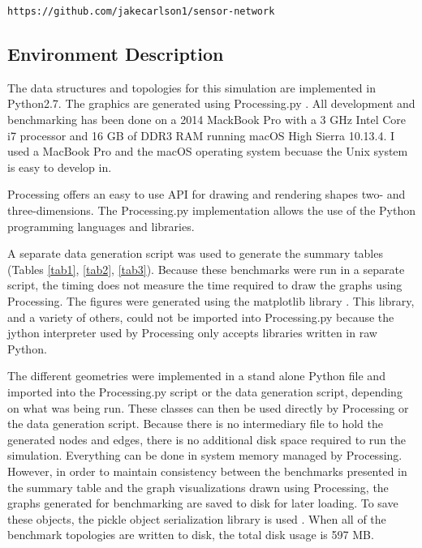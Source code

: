\documentclass{article}
\begin{document}
    \begin{center}
        \texttt{https://github.com/jakecarlson1/sensor-network}
    \end{center}

    \subsection{Environment Description}
    The data structures and topologies for this simulation are implemented in Python2.7. The graphics are generated using Processing.py \cite{processing}. All development and benchmarking has been done on a 2014 MackBook Pro with a 3 GHz Intel Core i7 processor and 16 GB of DDR3 RAM running macOS High Sierra 10.13.4. I used a MacBook Pro and the macOS operating system becuase the Unix system is easy to develop in.
    \par
    Processing offers an easy to use API for drawing and rendering shapes two- and three-dimensions. The Processing.py implementation allows the use of the Python programming languages and libraries.
    \par
    A separate data generation script was used to generate the summary tables (Tables \ref{tab1}, \ref{tab2}, \ref{tab3}). Because these benchmarks were run in a separate script, the timing does not measure the time required to draw the graphs using Processing. The figures were generated using the matplotlib library \cite{matplotlib}. This library, and a variety of others, could not be imported into Processing.py because the jython interpreter used by Processing only accepts libraries written in raw Python.
    \par
    The different geometries were implemented in a stand alone Python file and imported into the Processing.py script or the data generation script, depending on what was being run. These classes can then be used directly by Processing or the data generation script. Because there is no intermediary file to hold the generated nodes and edges, there is no additional disk space required to run the simulation. Everything can be done in system memory managed by Processing. However, in order to maintain consistency between the benchmarks presented in the summary table and the graph visualizations drawn using Processing, the graphs generated for benchmarking are saved to disk for later loading. To save these objects, the pickle object serialization library is used \cite{pickle}. When all of the benchmark topologies are written to disk, the total disk usage is 597 MB.
\end{document}
